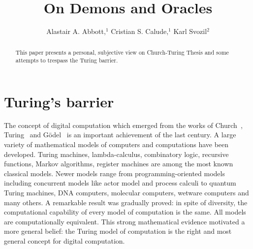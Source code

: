 \documentclass{comjnl}
\begin{document}
\title[On Demons and Oracles]{On Demons and Oracles}
\author{Alastair A. Abbott,$^{1}$  Cristian S. Calude,$^{1}$ Karl Svozil$^{2}$}







\begin{abstract}
This paper presents a personal, subjective view on Church-Turing Thesis and some attempts to trespass the Turing barrier.
\end{abstract}

\maketitle


\section{Turing's barrier}
The concept of digital computation which emerged  from the works of Church~\cite{church36},
Turing~\cite{turing-36} and G\"odel~\cite{godel1} is an important achievement of  the last century.
A large variety  of mathematical models  of computers and computations have been developed.
 Turing machines,
lambda-calculus,
combinatory logic, recursive functions,
Markov algorithms,
register machines
are among the most known classical
models. Newer models range from  programming-oriented models including concurrent models like actor model and process calculi to
quantum Turing machines, DNA computers, molecular computers, wetware computers and many others. A remarkable result
was gradually proved: in spite of  diversity, the computational capability of every model of computation is the same. All models are
computationally equivalent. This strong mathematical evidence motivated a more general belief: the Turing model of computation
is the right and most general concept for digital computation.
\end{document}
